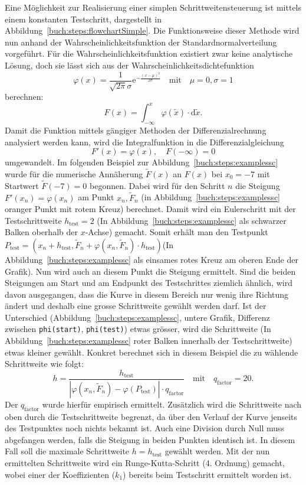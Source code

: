 Eine Möglichkeit zur Realisierung einer simplen Schrittweitensteuerung ist mittels einem konstanten Testschritt,
dargestellt in Abbildung~\ref{buch:steps:flowchartSimple}.
Die Funktionsweise dieser Methode wird nun anhand der Wahrscheinlichkeitsfunktion der Standardnormalverteilung vorgeführt.
Für die Wahrscheinlichkeitsfunktion existiert zwar keine analytische Lösung,
doch sie lässt sich aus der Wahrscheinlichkeitsdichtefunktion
\[
  \varphi(x)=\frac{1}{\sqrt{2\pi}\sigma}\mathrm{e}^{-\frac{(x-\mu)^2}{2 \sigma}}\quad \text{mit} \quad \mu=0,\sigma=1
\]
berechnen:
\[
  F(x)=\int_{-\infty}^{x} \varphi (\tilde{x}) \cdot \mathrm{d} \tilde{x}.
\]
Damit die Funktion mittels gängiger Methoden der Differenzialrechnung analysiert werden kann,
wird die Integralfunktion in die Differenzialgleichung
\[
  F'(x)=\varphi(x), \quad F(-\infty)=0
\]
umgewandelt.
Im folgenden Beispiel zur Abbildung~\ref{buch:steps:examplessc}
wurde für die numerische Annäherung $\tilde{F}(x)$ an $F(x)$ bei $x_0=-7$ mit Startwert $\tilde{F}(-7)=0$ begonnen.
Dabei wird für den Schritt $n$ die Steigung $F'(x_n)=\varphi(x_n)$ am Punkt $x_{n}, \tilde{F}_{n}$ (in Abbildung~\ref{buch:steps:examplessc} oranger Punkt mit rotem Kreuz) berechnet.
Damit wird ein Eulerschritt mit der Testschrittweite $h_\text{test}=2$ (In Abbildung~\ref{buch:steps:examplessc} als schwarzer Balken oberhalb der $x$-Achse) gemacht.
Somit erhält man den Testpunkt 
$P_\text{test}=(x_n+h_\text{test}, \tilde{F}_n+\varphi(x_n, \tilde{F}_n) \cdot h_\text{test})$(In Abbildung~\ref{buch:steps:examplessc} als einsames rotes Kreuz am oberen Ende der Grafik).
Nun wird auch an diesem Punkt die Steigung ermittelt.
Sind die beiden Steigungen am Start und am Endpunkt des Testschrittes ziemlich ähnlich, wird davon ausgegangen,
dass die Kurve in diesem Bereich nur wenig ihre Richtung ändert und deshalb eine grosse Schrittweite gewählt werden darf.
Ist der Unterschied (Abbildung~\ref{buch:steps:examplessc},
untere Grafik, Differenz zwischen \texttt{phi(start)}, \texttt{phi(test)}) etwas grösser,
wird die Schrittweite (In Abbildung~\ref{buch:steps:examplessc} roter Balken innerhalb der Testschrittweite) etwas kleiner gewählt.
Konkret berechnet sich in diesem Beispiel die zu wählende Schrittweite wie folgt:
\begin{equation}
  h=\frac{h_{\text{test}}}{|\varphi(x_n, \tilde{F}_n)-\varphi(P_{\text{test}})|\cdot q_{\text{factor}}}\quad \text{mit} \quad q_{\text{factor}}=20.
  \label{buch:steps:equationSimpleStepSize}
\end{equation}
Der $q_\text{factor}$ wurde hierfür empirisch ermittelt.
Zusätzlich wird die Schrittweite nach oben durch die Testschrittweite begrenzt,
da über den Verlauf der Kurve jenseits des Testpunktes noch nichts bekannt ist.
Auch eine Division durch Null muss abgefangen werden, falls die Steigung in beiden Punkten identisch ist.
In diesem Fall soll die maximale Schrittweite $h=h_{\text{test}}$ gewählt werden.
Mit der nun ermittelten Schrittweite wird ein Runge-Kutta-Schritt (4. Ordnung) gemacht,
wobei einer der Koeffizienten ($k_1$) bereits beim Testschritt ermittelt worden ist.

